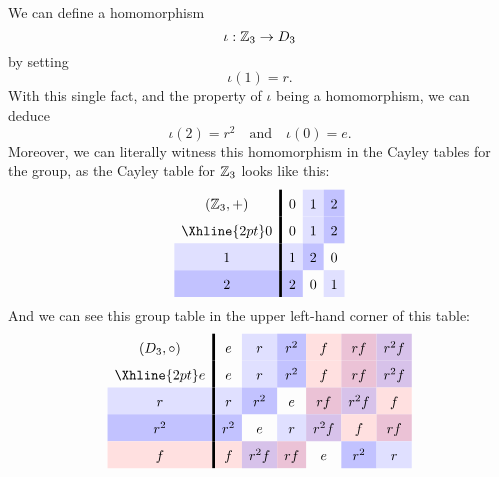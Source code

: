 \documentclass{ximera}
\begin{document}
\begin{example}
  We can define a homomorphism
  \[
  \iota:\mathbb Z_3\to D_3
  \]
  by setting
  \[
  \iota(1) = r. 
  \]
  With this single fact, and the property of $\iota$ being a
  homomorphism, we can deduce
  \[
  \iota(2) = r^2\quad\text{and}\quad \iota(0) = e.
  \]
  Moreover, we can literally witness this homomorphism in the Cayley
  tables for the group, as the Cayley table for $\mathbb Z_3$ looks like this:
  \[
  \renewcommand{\arraystretch}{1.6}
  \begin{array}{c!{\vline width 2pt}cccccc}
    (\Z_3,+)& 0     & 1\cellcolor{blue!12!white}     & 2\cellcolor{blue!24!white}   \\  \Xhline{2pt}
    0          & 0     & 1\cellcolor{blue!12!white}    & 2\cellcolor{blue!24!white}    \\  
    1\cellcolor{blue!12!white}         & 1\cellcolor{blue!12!white}    & 2\cellcolor{blue!24!white}   & 0   \\  
    2\cellcolor{blue!24!white}        & 2\cellcolor{blue!24!white}   & 0     & 1\cellcolor{blue!12!white}   \\  
  \end{array}
  \]
  And we can see this group table in the upper left-hand corner of this table:
  \[
    \renewcommand{\arraystretch}{1.6}
    \begin{array}{c!{\vline width 2pt}cccccc}
      (D_3,\circ)& e     & r\cellcolor{blue!12!white}     & r^2\cellcolor{blue!24!white}   & f \cellcolor{red!12!white}    & r f \cellcolor{blue!33!red!24!white}  & r^2 f\cellcolor{blue!66!red!24!white} \\  \Xhline{2pt}
      e          & e     & r\cellcolor{blue!12!white}    & r^2\cellcolor{blue!24!white}   & f \cellcolor{red!12!white}    & r f \cellcolor{blue!33!red!24!white}   & r^2f \cellcolor{blue!66!red!24!white} \\  
      r\cellcolor{blue!12!white}         & r\cellcolor{blue!12!white}    & r^2\cellcolor{blue!24!white}   & e     & rf\cellcolor{blue!33!red!24!white} & r^2f \cellcolor{blue!66!red!24!white}    & f \cellcolor{red!12!white}   \\  
      r^2\cellcolor{blue!24!white}        & r^2\cellcolor{blue!24!white}   & e     & r\cellcolor{blue!12!white}    & r^2 f \cellcolor{blue!66!red!24!white}   & f \cellcolor{red!12!white} & rf \cellcolor{blue!33!red!24!white}    \\  
      f \cellcolor{red!12!white}         & f \cellcolor{red!12!white}    & r^2f \cellcolor{blue!66!red!24!white}   & r f \cellcolor{blue!33!red!24!white} & e     & r^2\cellcolor{blue!24!white}    & r\cellcolor{blue!12!white}   \\  

\end{array}\]
\end{example}
\end{document}
